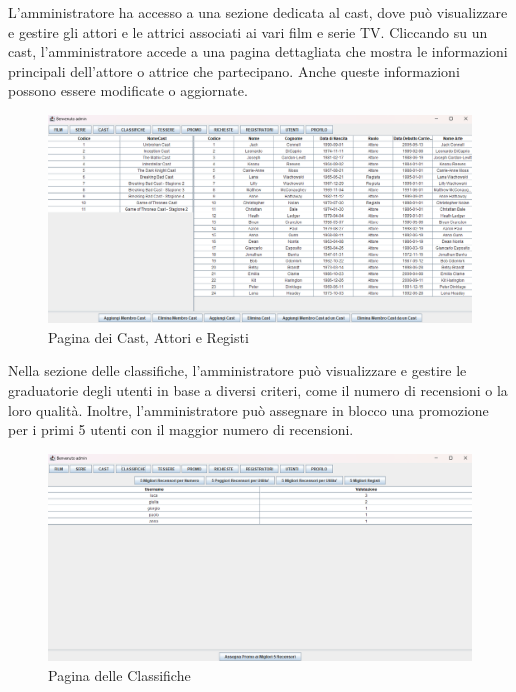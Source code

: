 \documentclass[a4paper,12pt]{report}
\begin{document}
L'amministratore ha accesso a una sezione dedicata al cast, dove può visualizzare e gestire gli attori e le attrici associati ai vari film e serie TV. Cliccando su un cast, l'amministratore accede a una pagina dettagliata che mostra le informazioni principali dell'attore o attrice che partecipano. Anche queste informazioni possono essere modificate o aggiornate. \\
\begin{figure}[H]
	\centering
	\includegraphics[width=375pt]{appimg/adminImages/sezionecast.png}
	\caption{Pagina dei Cast, Attori e Registi}
\end{figure}

Nella sezione delle classifiche, l'amministratore può visualizzare e gestire le graduatorie degli utenti in base a diversi criteri, come il numero di recensioni o la loro qualità. Inoltre, l'amministratore può assegnare in blocco una promozione per i primi 5 utenti con il maggior numero di recensioni. \\
\begin{figure}[H]
	\centering
	\includegraphics[width=375pt]{appimg/adminImages/sezioneclassifiche.png}
	\caption{Pagina delle Classifiche}
\end{figure}
\end{document}
